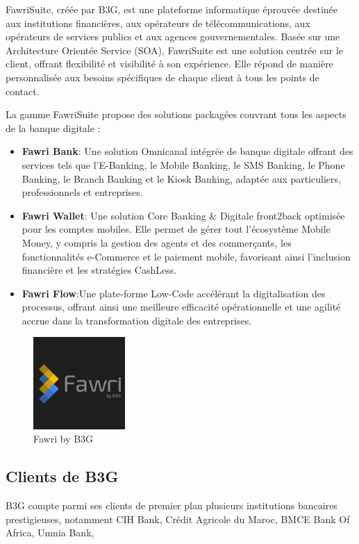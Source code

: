FawriSuite, créée par B3G, est une plateforme informatique éprouvée destinée aux institutions financières, aux opérateurs de télécommunications, aux opérateurs de services publics et aux agences gouvernementales. Basée sur une Architecture Orientée Service (SOA), FawriSuite est une solution centrée sur le client, offrant flexibilité et visibilité à son expérience. Elle répond de manière personnalisée aux besoins spécifiques de chaque client à tous les points de contact.

La gamme FawriSuite propose des solutions packagées couvrant tous les aspects de la banque digitale :
\begin{itemize}
\item \textbf{Fawri Bank}: Une solution Omnicanal intégrée de banque digitale offrant des services tels que l'E-Banking, le Mobile Banking, le SMS Banking, le Phone Banking, le Branch Banking et le Kiosk Banking, adaptée aux particuliers, professionnels et entreprises.
\item \textbf{Fawri Wallet}: Une solution Core Banking \& Digitale front2back optimisée pour les comptes mobiles. Elle permet de gérer tout l'écosystème Mobile Money, y compris la gestion des agents et des commerçants, les fonctionnalités e-Commerce et le paiement mobile, favorisant ainsi l'inclusion financière et les stratégies CashLess.
\item \textbf{Fawri Flow}:Une plate-forme Low-Code accélérant la digitalisation des processus, offrant ainsi une meilleure efficacité opérationnelle et une agilité accrue dans la transformation digitale des entreprises.


\end{itemize}



\begin{figure}[H] 
    \centering
    \includegraphics[width=3.5cm]{Logos/fawri.png}
    \caption{Fawri by B3G}
    \label{fig:my_label} %
\end{figure}

\subsection{Clients de B3G}
\hspace{\parindent}B3G compte parmi ses clients de premier plan plusieurs institutions bancaires prestigieuses, notamment CIH Bank, Crédit Agricole du Maroc, BMCE Bank Of Africa, Umnia Bank,

